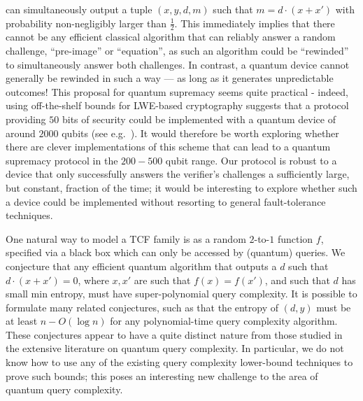 \documentclass[11pt]{article}
\theoremstyle{remark}
\theoremstyle{definition}
\begin{document}
can simultaneously output a tuple $(x, y, d, m)$ such that $m=d\cdot(x + x')$ with probability non-negligibly larger than $\frac{1}{2}$. This immediately implies that there cannot be any efficient classical algorithm that can reliably answer a random 
challenge, ``pre-image'' or ``equation'', as such an algorithm could be ``rewinded'' to simultaneously answer both challenges. In contrast, a quantum device cannot generally be rewinded in such a way --- as long as it generates unpredictable outcomes! This proposal for quantum supremacy seems quite practical - indeed, using off-the-shelf bounds for  LWE-based cryptography suggests that a protocol providing $50$ bits of security could be implemented with a quantum device of around $2000$ qubits (see e.g.~\cite{lindner2011better}). It would therefore be worth exploring whether there are clever implementations of this scheme 
that can lead to a quantum supremacy protocol in the $200-500$ qubit range. Our protocol is robust to a device that only successfully answers the verifier's challenges a sufficiently large, but constant, fraction of the time; it would be interesting to explore whether such a device could be implemented without resorting to general fault-tolerance techniques. 

\medskip

One natural way to model a TCF family is as a random $2$-to-$1$ function $f$, specified via a black box which can only be accessed by (quantum) queries.
We conjecture that any efficient quantum 
algorithm that outputs a $d$ such that $ d\cdot(x + x') = 0$, where $x,x'$ are such that $f(x) = f(x')$, and such that $d$ has small min entropy, must have super-polynomial query complexity. 
It is possible to formulate many related conjectures, such as that the entropy of $(d, y)$ must be at least $n - O(\log n)$ for any 
polynomial-time query complexity algorithm. These conjectures appear to have a quite distinct nature from those studied in the 
extensive literature on quantum query complexity. In particular, we do not know how to use 
any of the existing query complexity lower-bound techniques to prove such bounds;  this poses an interesting new challenge to 
the area of quantum query complexity. 
\end{document}
